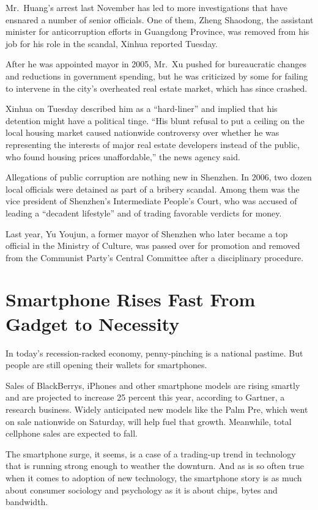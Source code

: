 \documentclass[12pt,a4paper,onecolumn]{article}
\begin{document}
Mr.~Huang's arrest last November has led to more investigations that have ensnared a number of
senior officials. One of them, Zheng Shaodong, the assistant minister for anticorruption efforts in
Guangdong Province, was removed from his job for his role in the scandal, Xinhua reported Tuesday.

After he was appointed mayor in 2005, Mr.~Xu pushed for bureaucratic changes and reductions in
government spending, but he was criticized by some for failing to intervene in the city's overheated
real estate market, which has since crashed.

Xinhua on Tuesday described him as a ``hard-liner'' and implied that his detention might have a
political tinge. ``His blunt refusal to put a ceiling on the local housing market caused nationwide
controversy over whether he was representing the interests of major real estate developers instead
of the public, who found housing prices unaffordable,'' the news agency said.

Allegations of public corruption are nothing new in Shenzhen. In 2006, two dozen local officials
were detained as part of a bribery scandal. Among them was the vice president of Shenzhen's
Intermediate People's Court, who was accused of leading a ``decadent lifestyle'' and of trading
favorable verdicts for money.

Last year, Yu Youjun, a former mayor of Shenzhen who later became a top official in the Ministry of
Culture, was passed over for promotion and removed from the Communist Party's Central Committee after a disciplinary procedure.

\section{Smartphone Rises Fast From Gadget to Necessity}

In today's recession-racked economy, penny-pinching is a national pastime. But people are still
opening their wallets for smartphones.

Sales of BlackBerrys, iPhones and other smartphone models are rising smartly and are projected to
increase 25 percent this year, according to Gartner, a research business. Widely anticipated new
models like the Palm Pre, which went on sale nationwide on Saturday, will help fuel that growth.
Meanwhile, total cellphone sales are expected to fall.

The smartphone surge, it seems, is a case of a trading-up trend in technology that is running strong
enough to weather the downturn. And as is so often true when it comes to adoption of new technology,
the smartphone story is as much about consumer sociology and psychology as it is about chips, bytes
and bandwidth.
\end{document}
